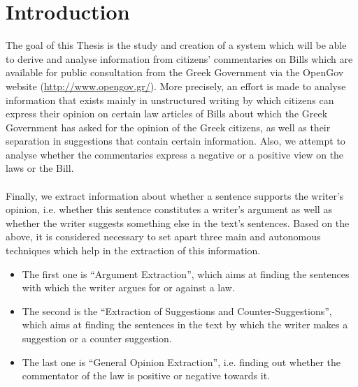 \chapter{Introduction}
The goal of this Thesis is the study and creation of a system which will be able to derive and analyse information from citizens' commentaries on Bills which are available for public consultation from the Greek Government via the OpenGov website (\url{http://www.opengov.gr/}). More precisely, an effort is made to analyse information that exists mainly in unstructured writing by which citizens can express their opinion on certain law articles of Bills about which the Greek Government has asked for the opinion of the Greek citizens, as well as their separation in suggestions that contain certain information. Also, we attempt to analyse whether the commentaries express a negative or a positive view on the laws or the Bill.\\
\\
Finally, we extract information about whether a sentence supports the writer's opinion, i.e. whether this sentence constitutes a writer's argument as well as whether the writer suggests something else in the text's sentences. Based on the above, it is considered necessary to set apart three main and autonomous techniques which help in the extraction of this information.\\

\begin{itemize}

	\item The first one is ``Argument Extraction'', which aims at finding the sentences with which the writer argues for or against a law.
	\item The second is the ``Extraction of  Suggestions and Counter-Suggestions'', which aims at finding the sentences in the text by which the writer makes a suggestion or a counter suggestion.
	\item The last one is ``General Opinion Extraction'', i.e. finding out whether the commentator of the law is positive or negative towards it.

\end{itemize}

